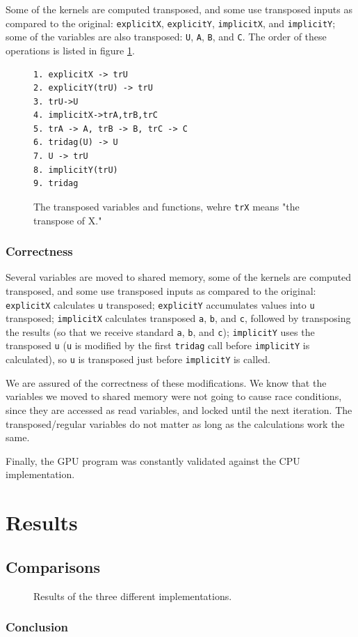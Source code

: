 \documentclass[12pt, oneside]{article}
\begin{document}
Some of the kernels are computed transposed, and some use transposed inputs as compared to the original: \texttt{explicitX},  \texttt{explicitY},  \texttt{implicitX}, and \texttt{implicitY}; some of the variables are also transposed: \texttt{U}, \texttt{A}, \texttt{B}, and \texttt{C}. The order of these operations is listed in figure \ref{fig:trcode}.
\begin{figure}[h]
\begin{lstlisting}
1. explicitX -> trU
2. explicitY(trU) -> trU
3. trU->U
4. implicitX->trA,trB,trC
5. trA -> A, trB -> B, trC -> C
6. tridag(U) -> U
7. U -> trU
8. implicitY(trU)
9. tridag
\end{lstlisting}
\caption{\label{fig:trcode} The transposed variables and functions, wehre \texttt{trX} means "the transpose of X."}
\end{figure}
\subsubsection{Correctness}
Several variables are moved to shared memory, some of the kernels are computed transposed, and some use transposed inputs as compared to the original: \texttt{explicitX} calculates \texttt{u} transposed; \texttt{explicitY} accumulates values into \texttt{u} transposed; \texttt{implicitX} calculates transposed \texttt{a}, \texttt{b}, and \texttt{c}, followed by transposing the results (so that we receive standard \texttt{a}, \texttt{b}, and \texttt{c}); \texttt{implicitY} uses the transposed \texttt{u} (\texttt{u} is modified by the first \texttt{tridag} call before \texttt{implicitY} is calculated), so \texttt{u} is transposed just before \texttt{implicitY} is called.

We are assured of the correctness of these modifications. We know that the variables we moved to shared memory were not going to cause race conditions, since they are accessed as read variables, and locked until the next iteration. The transposed/regular variables do not matter as long as the calculations work the same.

Finally, the GPU program was constantly validated against the CPU implementation.
\section{Results}
\subsection{Comparisons}
\begin{figure}[h]
\caption{\label{fig:results} Results of the three different implementations.}
\end{figure}
\subsubsection{Conclusion}


\end{document}
